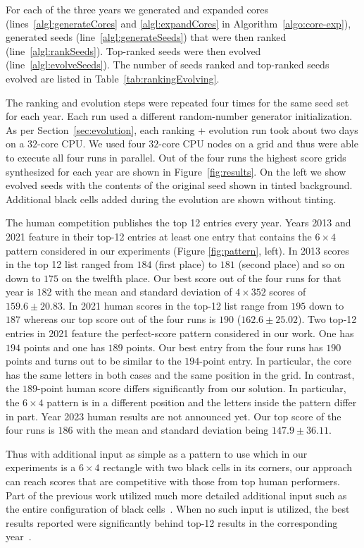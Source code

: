 For each of the three years we generated and expanded cores (lines~\ref{algl:generateCores} and \ref{algl:expandCores} in Algorithm~\ref{algo:core-exp}), generated seeds (line~\ref{algl:generateSeeds}) that were then ranked (line~\ref{algl:rankSeeds}). Top-ranked seeds were then evolved (line~\ref{algl:evolveSeeds}). The number of seeds ranked and top-ranked seeds evolved are listed in Table~\ref{tab:rankingEvolving}.


The ranking and evolution steps were repeated four times for the same seed set for each year. Each run used a different random-number generator initialization. As per Section~\ref{sec:evolution}, each ranking + evolution run took about two days on a $32$-core CPU. We used four $32$-core CPU nodes on a grid and thus were able to execute all four runs in parallel. Out of the four runs the highest score grids synthesized for each year are shown in Figure~\ref{fig:results}. On the left we show evolved seeds with the contents of the original seed shown in tinted background. Additional black cells added during the evolution are shown without tinting.

The human competition publishes the top 12 entries every year. Years 2013 and 2021 feature in their top-12 entries at least one entry that contains the $6 \times 4$ pattern considered in our experiments (Figure \ref{fig:pattern}, left). In 2013 scores in the top 12 list ranged from $184$ (first place) to $181$ (second place) and so on down to $175$ on the twelfth place. Our best score out of the four runs for that year is $182$  with the mean and standard deviation of $4 \times 352$ scores of $159.6  \pm 20.83$. In 2021 human scores in the top-12 list range from $195$ down to $187$ whereas our top score out of the four runs is $190$ ($162.6 \pm 25.02$). Two top-12 entries in 2021 feature the perfect-score pattern considered in our work. One has $194$ points and one has $189$ points. Our best entry from the four runs has $190$ points and turns out to be similar to the $194$-point entry. In particular, the core has the same letters in both cases and the same position in the grid. In contrast, the $189$-point human score differs significantly from our solution. In particular, the $6 \times 4$ pattern is in a different position and the letters inside the pattern differ in part. Year 2023 human results are not announced yet. Our top score of the four runs is $186$ with the mean and standard deviation being $147.9 \pm 36.11$.

Thus with additional input as simple as a pattern to use which in our experiments is a $6 \times 4$ rectangle with two black cells in its corners, our approach can reach scores that are competitive with those from top human performers. Part of the previous work utilized much more detailed additional input such as the entire configuration of black cells~\cite{DBLP:conf/socs/BoteaB21}. When no such input is utilized, the best results reported were significantly behind top-12 results in the corresponding
year~\cite{DBLP:conf/cig/BulitkoB21,Botea_Bulitko_2022}.


